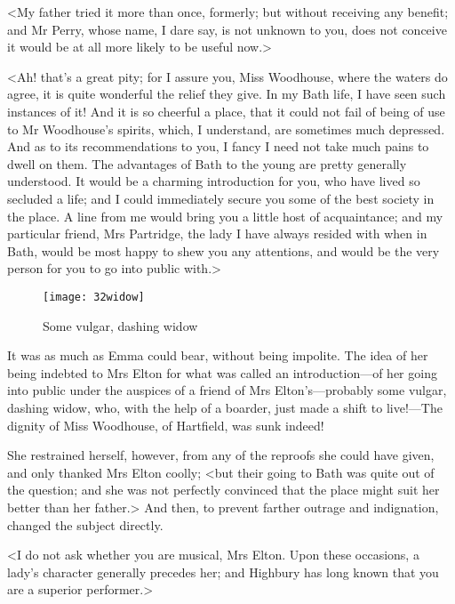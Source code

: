 <My father tried it more than once, formerly; but without receiving any benefit; and Mr Perry, whose name, I dare say, is not unknown to you, does not conceive it would be at all more likely to be useful now.>

<Ah! that's a great pity; for I assure you, Miss Woodhouse, where the waters do agree, it is quite wonderful the relief they give. In my Bath life, I have seen such instances of it! And it is so cheerful a place, that it could not fail of being of use to Mr Woodhouse's spirits, which, I understand, are sometimes much depressed. And as to its recommendations to you, I fancy I need not take much pains to dwell on them. The advantages of Bath to the young are pretty generally understood. It would be a charming introduction for you, who have lived so secluded a life; and I could immediately secure you some of the best society in the place. A line from me would bring you a little host of acquaintance; and my particular friend, Mrs Partridge, the lady I have always resided with when in Bath, would be most happy to shew you any attentions, and would be the very person for you to go into public with.>

\begin{figure}[tbph]
\centering
\texttt{[image: 32widow]}
\caption{Some vulgar, dashing widow}
\end{figure}

It was as much as Emma could bear, without being impolite. The idea of her being indebted to Mrs Elton for what was called an introduction—of her going into public under the auspices of a friend of Mrs Elton's—probably some vulgar, dashing widow, who, with the help of a boarder, just made a shift to live!—The dignity of Miss Woodhouse, of Hartfield, was sunk indeed!

She restrained herself, however, from any of the reproofs she could have given, and only thanked Mrs Elton coolly; <but their going to Bath was quite out of the question; and she was not perfectly convinced that the place might suit her better than her father.> And then, to prevent farther outrage and indignation, changed the subject directly.

<I do not ask whether you are musical, Mrs Elton. Upon these occasions, a lady's character generally precedes her; and Highbury has long known that you are a superior performer.>


